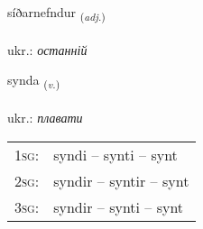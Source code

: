 \documentclass[frontgrid, backgrid]{flacards}\usepackage[]{graphicx}\usepackage[]{xcolor}
\begin{document}
\renewcommand{\flhead}{\vskip5pt \fboxsep=0pt {\small\bfseries\footnotesize Lýsingarorð | прикметник}}
\renewcommand{\fcfoot}{\vskip5pt \fboxsep=0pt \hspace{2pt}{\small\bfseries\footnotesize 3K}}

\renewcommand{\blhead}{\vskip5pt {\small\bfseries\footnotesize Lýsingarorð | прикметник }}
\renewcommand{\bcfoot}{\vskip5pt \hspace{2pt}{\small\bfseries\footnotesize 3K}}


{síðarnefndur \small{\textsubscript{(\textit{adj.})}} \\[1ex] %
\textphonetic{[siːðarnɛmtʏr]} \\
ukr.: \emph{останній} \\  [2ex]
\renewcommand*{\arraystretch}{0.8}
}

\renewcommand{\flhead}{\vskip5pt \fboxsep=0pt {\small\bfseries\footnotesize Sagnorð | дієслово}}
\renewcommand{\fcfoot}{\vskip5pt \fboxsep=0pt \hspace{2pt}{\small\bfseries\footnotesize 3K}}

\renewcommand{\blhead}{\vskip5pt {\small\bfseries\footnotesize Sagnorð | дієслово }}
\renewcommand{\bcfoot}{\vskip5pt \hspace{2pt}{\small\bfseries\footnotesize 3K}}


{synda \small{\textsubscript{(\textit{v.})}} \\[1ex] %
\textphonetic{[sɪnta]} \\
ukr.: \emph{плавати} \\  [2ex]
\renewcommand*{\arraystretch}{0.8}
\begin{tabular}{p{1cm}l}
\textsc{1sg}: & syndi -- synti -- synt \\ 
\textsc{2sg}: & syndir -- syntir -- synt \\ 
\textsc{3sg}: & syndir -- synti -- synt \\ 
\end{tabular}
}
\end{document}
